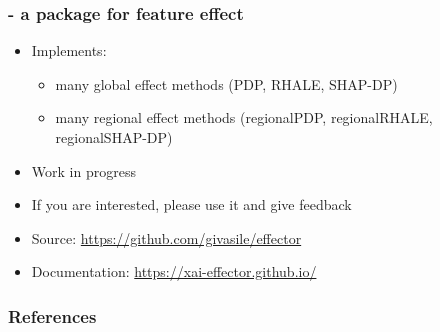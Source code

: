 \documentclass{beamer}
\begin{document}
\begin{frame}
  \frametitle{ - a  package for feature effect}
  \begin{itemize}
  \item Implements:
    \begin{itemize}
    \item many global effect methods (PDP, RHALE, SHAP-DP)
    \item many regional effect methods (regionalPDP, regionalRHALE, regionalSHAP-DP)
    \end{itemize}
  \item Work in progress
  \item If you are interested, please use it and give feedback
  \item Source: \href{https://github.com/givasile/effector}{https://github.com/givasile/effector}
  \item Documentation: \href{https://xai-effector.github.io/}{https://xai-effector.github.io/}
    \end{itemize}
\end{frame}


\begin{frame}[allowframebreaks]
  \frametitle{References}
  \printbibliography
\end{frame}
\end{document}
